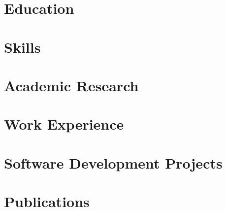 \documentclass[letter,12pt]{article}
\begin{document}
\vspace*{60pt}

%

\section{Education}


\section{Skills}


\section{Academic Research}


\section{Work Experience}


\section{Software Development Projects}


\section{Publications}


\thispagestyle{empty}
\end{document}
